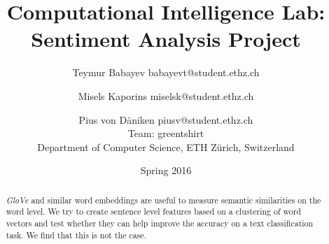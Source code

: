 \documentclass[a4paper, 11pt, notitlepage]{article}
\title{Computational Intelligence Lab:\\Sentiment Analysis Project}
\author{Teymur Babayev babayevt@student.ethz.ch \and Misels Kaporins miselsk@student.ethz.ch \and Pius von D\"aniken piusv@student.ethz.ch \\
Team: greentshirt \\
Department of Computer Science, ETH Z\"urich, Switzerland
}
\date{Spring 2016}
\begin{document}
\maketitle

\begin{abstract}
    \textit{GloVe} and similar word embeddings are useful to measure semantic
    similarities on the word level. We try to create sentence level features
    based on a clustering of word vectors and test whether they can help
    improve the accuracy on a text classification task. We find that this is not
    the case.
\end{abstract}











\end{document}
